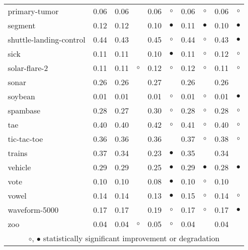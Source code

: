 {\begin{longtable}{lrr@{\hspace{0.1cm}}cr@{\hspace{0.1cm}}cr@{\hspace{0.1cm}}cr@{\hspace{0.1cm}}c}
primary-tumor & 0.06 & 0.06 &           & 0.06 &   $\circ$ & 0.06 &   $\circ$ & 0.06 &    $\circ$\\
segment & 0.12 & 0.12 &           & 0.10 & $\bullet$ & 0.11 & $\bullet$ & 0.10 &  $\bullet$\\
shuttle-landing-control & 0.44 & 0.43 &           & 0.45 &   $\circ$ & 0.44 &   $\circ$ & 0.43 &  $\bullet$\\
sick & 0.11 & 0.11 &           & 0.10 & $\bullet$ & 0.11 &   $\circ$ & 0.12 &    $\circ$\\
solar-flare-2 & 0.11 & 0.11 &   $\circ$ & 0.12 &   $\circ$ & 0.12 &   $\circ$ & 0.11 &    $\circ$\\
sonar & 0.26 & 0.26 &           & 0.27 &           & 0.26 &           & 0.26 &           \\
soybean & 0.01 & 0.01 &           & 0.01 &   $\circ$ & 0.01 &   $\circ$ & 0.01 &  $\bullet$\\
spambase & 0.28 & 0.27 &           & 0.30 &   $\circ$ & 0.28 &   $\circ$ & 0.28 &    $\circ$\\
tae & 0.40 & 0.40 &           & 0.42 &   $\circ$ & 0.41 &   $\circ$ & 0.40 &    $\circ$\\
tic-tac-toe & 0.36 & 0.36 &           & 0.36 &           & 0.37 &   $\circ$ & 0.38 &    $\circ$\\
trains & 0.37 & 0.34 &           & 0.23 & $\bullet$ & 0.35 &           & 0.34 &           \\
vehicle & 0.29 & 0.29 &           & 0.25 & $\bullet$ & 0.29 & $\bullet$ & 0.28 &  $\bullet$\\
vote & 0.10 & 0.10 &           & 0.08 & $\bullet$ & 0.10 &   $\circ$ & 0.10 &           \\
vowel & 0.14 & 0.14 &           & 0.13 & $\bullet$ & 0.15 &   $\circ$ & 0.14 &    $\circ$\\
waveform-5000 & 0.17 & 0.17 &           & 0.19 &   $\circ$ & 0.17 &   $\circ$ & 0.17 &  $\bullet$\\
zoo & 0.04 & 0.04 &   $\circ$ & 0.05 &   $\circ$ & 0.04 &           & 0.04 &           \\
\hline
\multicolumn{10}{c}{$\circ$, $\bullet$ statistically significant improvement or degradation}\\
\end{longtable} \footnotesize \par}
